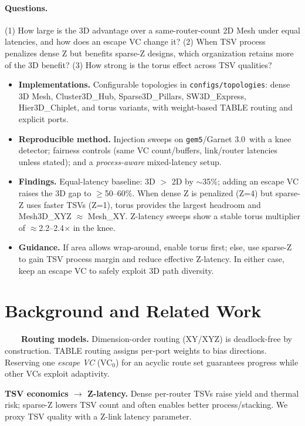 \documentclass[11pt]{article}
\newcommand{\Ruby}{Garnet 3.0}
\begin{document}
\paragraph{Questions.}
(1) How large is the 3D advantage over a same-router-count 2D Mesh under equal
latencies, and how does an escape VC change it? (2) When TSV process penalizes
dense Z but benefits sparse-Z designs, which organization retains more of the
3D benefit? (3) How strong is the torus effect across TSV qualities?


\begin{itemize}[leftmargin=1.2em]
  \item \textbf{Implementations.} Configurable topologies in
        \texttt{configs/topologies}: dense 3D Mesh, Cluster3D\_Hub,
        Sparse3D\_Pillars, SW3D\_Express, Hier3D\_Chiplet, and torus variants,
        with weight-based TABLE routing and explicit ports.
  \item \textbf{Reproducible method.} Injection sweeps on \texttt{gem5}/\Ruby\
        with a knee detector; fairness controls (same VC count/buffers,
        link/router latencies unless stated); and a \emph{process-aware}
        mixed-latency setup.
  \item \textbf{Findings.} Equal-latency baseline: 3D $>$ 2D by $\sim$35\%;
        adding an escape VC raises the 3D gap to $\ge$50–60\%.
        When dense Z is penalized (Z=4) but sparse-Z uses faster TSVs (Z=1),
        torus provides the largest headroom and Mesh3D\_XYZ $\approx$ Mesh\_XY.
        Z-latency sweeps show a stable torus multiplier of
        $\approx$2.2–2.4$\times$ in the knee.
  \item \textbf{Guidance.} If area allows wrap-around, enable torus first; else,
        use sparse-Z to gain TSV process margin and reduce effective Z-latency.
        In either case, keep an escape VC to safely exploit 3D path diversity.
\end{itemize}

\section{Background and Related Work}

\ \ \ \ \textbf{Routing models.} Dimension-order routing (XY/XYZ) is deadlock-free by
construction. TABLE routing assigns per-port weights to bias directions.
Reserving one \emph{escape VC} (VC$_0$) for an acyclic route set guarantees
progress while other VCs exploit adaptivity.

\textbf{TSV economics $\rightarrow$ Z-latency.} Dense per-router TSVs raise
yield and thermal risk; sparse-Z lowers TSV count and often enables better
process/stacking. We proxy TSV quality with a Z-link latency parameter.
\end{document}
